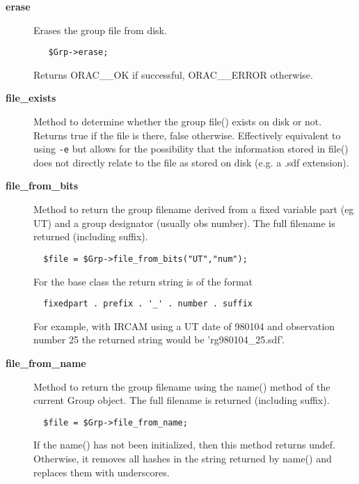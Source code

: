 \begin{description}
\item[{\textbf{erase}}] \mbox{}

Erases the group file from disk.

\begin{verbatim}
   $Grp->erase;
\end{verbatim}


Returns ORAC\_\_OK if successful, ORAC\_\_ERROR otherwise.


\item[{\textbf{file\_exists}}] \mbox{}

Method to determine whether the group file() exists on disk or not.
Returns true if the file is there, false otherwise. Effectively
equivalent to using \texttt{-e} but allows for the possibility that the
information stored in file() does not directly relate to the
file as stored on disk (e.g. a .sdf extension).


\item[{\textbf{file\_from\_bits}}] \mbox{}

Method to return the group filename derived from a fixed
variable part (eg UT) and a group designator (usually obs
number). The full filename is returned (including suffix).

\begin{verbatim}
  $file = $Grp->file_from_bits("UT","num");
\end{verbatim}


For the base class the return string is of the format

\begin{verbatim}
  fixedpart . prefix . '_' . number . suffix
\end{verbatim}


For example, with IRCAM using a UT date of 980104 and observation
number 25 the returned string would be 'rg980104\_25.sdf'.


\item[{\textbf{file\_from\_name}}] \mbox{}

Method to return the group filename using the name() method of the
current Group object. The full filename is returned (including
suffix).

\begin{verbatim}
  $file = $Grp->file_from_name;
\end{verbatim}


If the name() has not been initialized, then this method returns
undef. Otherwise, it removes all hashes in the string returned by
name() and replaces them with underscores.




\end{description}
